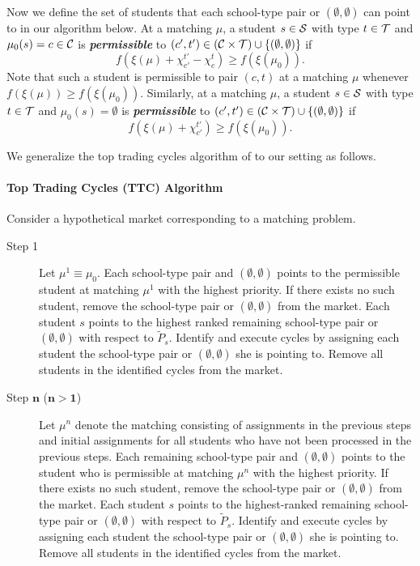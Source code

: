 \documentclass[12pt]{amsart}
\theoremstyle{remark}
\newcommand{\df}[1]{\textbf{\textit{#1}}}
\newcommand{\mby}[1]{{\color{blue} MBY: #1 }}
\begin{document}
Now we define the set of students that each school-type pair or $(\emptyset,\emptyset)$ can point to in our algorithm below.
At a matching $\mu$, a student $s\in \mathcal{S}$ with type $t\in \mathcal{T}$ and $\mu_0(s)=c\in \mathcal{C}$ is \df{permissible}
to $(c',t') \in \left(\mathcal{C} \times \mathcal{T}\right) \cup \{(\emptyset,\emptyset)\}$ %
if \[f(\xi(\mu)+\chi_{c'}^{t'}-\chi_c^t) \geq f(\xi(\mu_0)).\]
Note that such a student is permissible to pair $(c,t)$ at a matching $\mu$ whenever $f(\xi(\mu)) \geq f(\xi(\mu_0))$.
Similarly, at a matching $\mu$, a student $s\in \mathcal{S}$ with type $t\in \mathcal{T}$ and $\mu_0(s)=\emptyset$ is \df{permissible}
to $(c',t')\in \left(\mathcal{C} \times \mathcal{T}\right) \cup \{(\emptyset,\emptyset)\}$ %
if \[f(\xi(\mu)+\chi_{c'}^{t'}) \geq f(\xi(\mu_0)).\]

We generalize the top trading cycles algorithm of \citet{shasca74} to our setting as follows.
\medskip

\paragraph{\textbf{Top Trading Cycles (TTC) Algorithm}}
Consider a hypothetical market corresponding to a matching problem.
\begin{description}
  \item[Step 1] Let $\mu^1 \equiv \mu_0$. Each school-type pair and $(\emptyset,\emptyset)$ points to the permissible student at matching $\mu^1$ with the highest priority.
  If there exists no such student, remove the school-type pair or $(\emptyset,\emptyset)$ from the market. Each student $s$ points to the highest ranked
  remaining school-type pair or $(\emptyset,\emptyset)$ with respect to $\tilde{P}_s$. Identify and execute cycles by assigning each student the school-type pair or $(\emptyset,\emptyset)$ she is pointing to. Remove all students in the identified cycles from the market.
  \item[Step $\mathbf{n}$ ($\mathbf{n>1}$)] Let $\mu^n$ denote the matching consisting of assignments in the previous steps and initial assignments for all students who have not been processed in the previous steps. Each remaining school-type pair and $(\emptyset,\emptyset)$ points to the student who is permissible at matching $\mu^n$ with the highest priority. If there exists no such student, remove the school-type pair or $(\emptyset,\emptyset)$ from the market. Each student $s$ points to the highest-ranked remaining school-type pair or $(\emptyset,\emptyset)$ with respect to $\tilde{P}_s$. Identify and execute cycles by assigning each student the school-type pair or $(\emptyset,\emptyset)$ she is pointing to. Remove all students in the identified cycles from the market.
\end{description}
\end{document}
